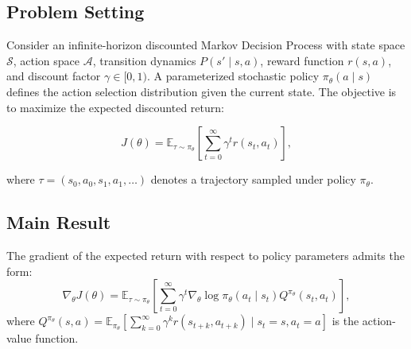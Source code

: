 \subsection{Problem Setting}

Consider an infinite-horizon discounted Markov Decision Process with state space $\mathcal{S}$, action space $\mathcal{A}$, transition dynamics $P(s' \mid s, a)$, reward function $r(s, a)$, and discount factor $\gamma \in [0, 1)$. A parameterized stochastic policy $\pi_\theta(a \mid s)$ defines the action selection distribution given the current state. The objective is to maximize the expected discounted return:

\begin{equation}
J(\theta) = \mathbb{E}_{\tau \sim \pi_\theta}\left[\sum_{t=0}^{\infty} \gamma^t r(s_t, a_t)\right],
\end{equation}

where $\tau = (s_0, a_0, s_1, a_1, \ldots)$ denotes a trajectory sampled under policy $\pi_\theta$.

\subsection{Main Result}

\begin{theorem}
\label{thm:policy_gradient}
The gradient of the expected return with respect to policy parameters admits the form:
\begin{equation}
\nabla_\theta J(\theta) = \mathbb{E}_{\tau \sim \pi_\theta}\left[\sum_{t=0}^{\infty} \gamma^t \nabla_\theta \log \pi_\theta(a_t \mid s_t) Q^{\pi_\theta}(s_t, a_t)\right],
\end{equation}
where $Q^{\pi_\theta}(s, a) = \mathbb{E}_{\pi_\theta}\left[\sum_{k=0}^{\infty} \gamma^k r(s_{t+k}, a_{t+k}) \mid s_t = s, a_t = a\right]$ is the action-value function.
\end{theorem}

